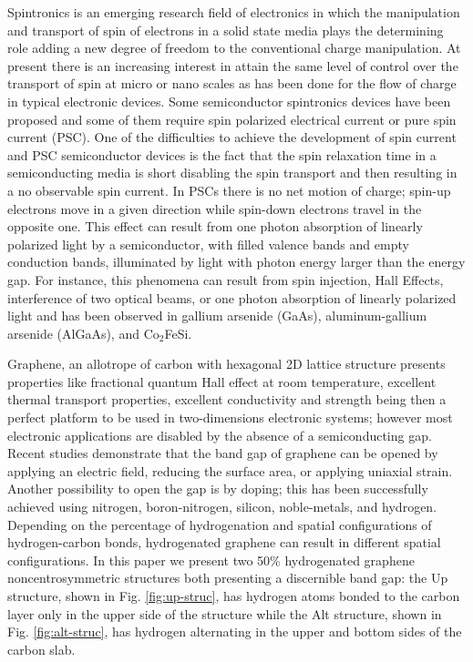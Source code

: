 \documentclass[prb,11pt,tightenlines,twocolumn,aps]{revtex4-1}
\begin{document}
Spintronics is an emerging research field of electronics in which the
manipulation and transport of spin of electrons in a solid state 
media plays the determining role adding a new degree of freedom to the
conventional charge manipulation.\cite{wolfSC04,fabianAPS07}
% 
At present there is an increasing interest in attain the same level of control
over the transport of spin at micro or nano scales as has been done for the
flow of charge in typical electronic devices.\cite{awschalomNP2007} Some
semiconductor spintronics devices have been proposed \cite{majumdarAPL06,
dattaAPL90,gotteNat16,pershinPRB08} and some of them require spin polarized
electrical current \cite{awschalomSSBM13} or pure spin current (PSC).
% 
One of the difficulties to achieve the development of spin current and PSC
semiconductor devices is the fact that the spin relaxation time in a
semiconducting media is short disabling the spin transport and then resulting
in a no observable spin current.\cite{murakamiSc03}
% 
In PSCs there is no net
motion of charge; spin-up electrons move in a given direction while spin-down
electrons travel in the opposite one. 
This effect can result from one photon absorption of linearly polarized light
by a semiconductor, with filled valence bands and empty conduction bands,
illuminated by light with photon energy larger than the energy gap.
For instance,
this phenomena can result from spin
injection,\cite{malPRB03} Hall Effects,\cite{sinovaPRB04} interference of two
optical beams,\cite{bhatPRL00, najmaiePRB03} or one photon absorption of
linearly polarized light\cite{bhatPRL05} and has been observed in gallium
arsenide (GaAs),\cite{zhaoPRL2006, stevensPRL03} aluminum-gallium arsenide
(AlGaAs),\cite{stevensPRL03} and Co$_2$FeSi.\cite{kimuraNGPAM12}

Graphene, an allotrope of carbon with hexagonal 2D lattice structure presents
properties like fractional quantum Hall effect at room temperature, excellent
thermal transport properties, excellent conductivity\cite{heerscheNat07} and
strength \cite{geimNM07, reinaNL08, novoselov2S07, balandinNL08} being then a
perfect platform to be used in two-dimensions electronic systems; however most
electronic applications are disabled by the absence of a semiconducting gap.
Recent studies demonstrate that the band gap of graphene can be opened by
applying an electric field,\cite{zhangN09} reducing the surface
area,\cite{hanPRL07} or applying uniaxial strain.\cite{niACSN08} Another
possibility to open the gap is by doping; this has been successfully achieved
using nitrogen,\cite{weiNL2009} boron-nitrogen,\cite{guoIJ11}
silicon,\cite{colettiPRB10} noble-metals,\cite{varykhalovPRB10} and
hydrogen.\cite{eliasS09, guisingerNL09, samarakoonACSN10}
% 
Depending on the percentage of hydrogenation and spatial configurations of
hydrogen-carbon bonds, hydrogenated graphene can result in different spatial
configurations.
% 
In this paper we present two 50\% hydrogenated graphene noncentrosymmetric
structures both presenting a discernible band gap: the Up structure,
shown in Fig. \ref{fig:up-struc}, has hydrogen atoms bonded to the carbon layer
only in the upper side of the structure while the Alt structure, shown
in Fig. \ref{fig:alt-struc}, has hydrogen alternating in the upper and bottom
sides of the carbon slab.\cite{zapataPSB2016}
\end{document}
